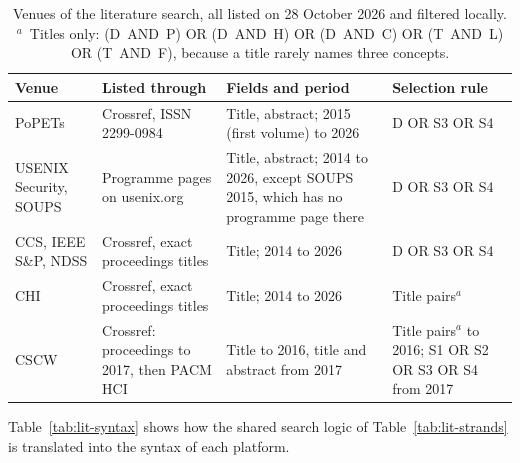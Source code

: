 \begin{table}[H]
\centering
\begin{singlespace}
\caption[Venues of the literature search]{Venues of the literature search, all
listed on 28 October 2026 and filtered locally. $^a$~Titles only:
\mbox{(D AND P)} OR \mbox{(D AND H)} OR \mbox{(D AND C)} OR \mbox{(T AND L)} OR
\mbox{(T AND F)}, because a title rarely names three concepts.}
\label{tab:lit-venues}
\small
\begin{tabularx}{\textwidth}{@{}>{\raggedright\arraybackslash}p{2.3cm}>{\raggedright\arraybackslash}p{3.0cm}>{\raggedright\arraybackslash}p{3.7cm}>{\raggedright\arraybackslash}X@{}}
\toprule
\textbf{Venue} & \textbf{Listed through} & \textbf{Fields and period} & \textbf{Selection rule} \\
\midrule
PoPETs & Crossref, ISSN 2299-0984 & Title, abstract; 2015 (first volume) to 2026 & D OR S3 OR S4 \\
USENIX Security, SOUPS & Programme pages on usenix.org & Title, abstract; 2014 to 2026, except SOUPS 2015, which has no programme page there & D OR S3 OR S4 \\
CCS, IEEE S\&P, NDSS & Crossref, exact proceedings titles & Title; 2014 to 2026 & D OR S3 OR S4 \\
CHI & Crossref, exact proceedings titles & Title; 2014 to 2026 & Title pairs$^a$ \\
CSCW & Crossref: proceedings to 2017, then PACM HCI & Title to 2016, title and abstract from 2017 & Title pairs$^a$ to 2016; S1 OR S2 OR S3 OR S4 from 2017 \\
\bottomrule
\end{tabularx}
\end{singlespace}
\end{table}

Table~\ref{tab:lit-syntax} shows how the shared search logic of Table~\ref{tab:lit-strands} is
translated into the syntax of each platform.

